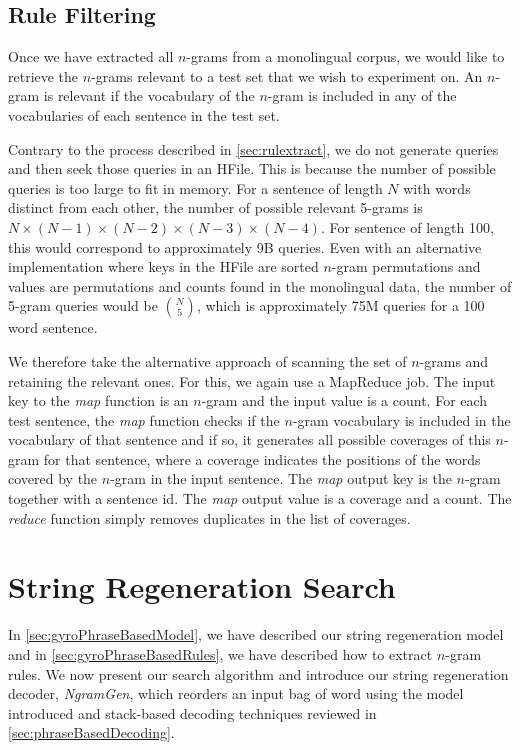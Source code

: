 \subsection{Rule Filtering}
\label{sec:ngramRuleFiltering}

Once we have extracted all $n$-grams from a monolingual corpus, we
would like to retrieve the $n$-grams relevant to a test set
that we wish to experiment on. An $n$-gram is relevant if the vocabulary
of the $n$-gram is included in any of the vocabularies of each
sentence in the test set.

Contrary to the process described in \autoref{sec:rulextract}, we
do not generate queries and then seek those queries in an HFile.
This is because the number of possible queries is too large
to fit in memory. For a sentence of length $N$ with words distinct
from each other, the number of possible relevant 5-grams is
$N \times (N - 1) \times (N - 2) \times (N - 3) \times (N - 4)$.
For sentence of length 100, this would correspond to approximately
9B queries. Even with an alternative implementation where keys in the
HFile are sorted $n$-gram permutations and values are permutations and counts found in
the monolingual data, the number of 5-gram queries would be $N \choose 5$, which
is approximately 75M queries for a 100 word sentence.

We therefore take the alternative approach of scanning the set of $n$-grams
and retaining the relevant ones. For this, we again use a MapReduce
job. The input key to the \emph{map} function is an $n$-gram and
the input value is a count. For each test sentence, the \emph{map}
function checks if the $n$-gram vocabulary is included in the
vocabulary of that sentence and if so, it generates all possible
coverages of this $n$-gram for that sentence, where a coverage
indicates the positions of the words covered by the $n$-gram
in the input sentence. The \emph{map}
output key is the $n$-gram together with a sentence id. The \emph{map}
output value is a coverage and a count. The \emph{reduce} function
simply removes duplicates in the list of coverages. %

\section{String Regeneration Search}
\label{sec:gyroDecoderAlgorithm}

In \autoref{sec:gyroPhraseBasedModel}, we have described our
string regeneration model and in \autoref{sec:gyroPhraseBasedRules},
we have described how to extract $n$-gram rules. We now
present our search algorithm and introduce our
string regeneration decoder, \emph{NgramGen}, which
reorders an input bag of word using the model introduced and
stack-based decoding techniques reviewed in \autoref{sec:phraseBasedDecoding}.

